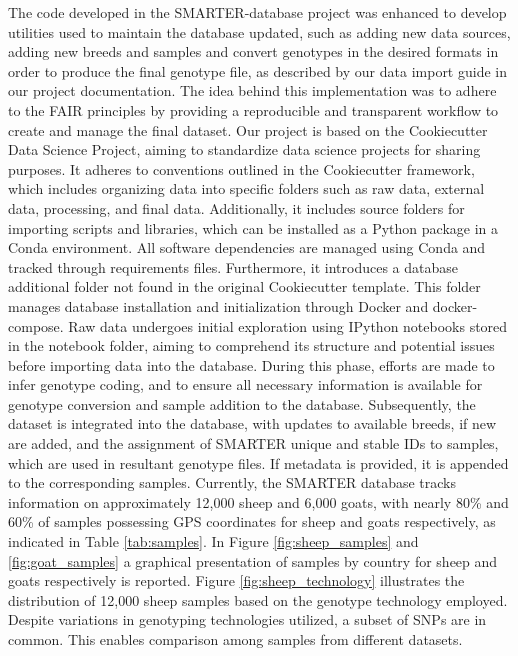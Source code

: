\documentclass[a4paper,num-refs,gigabyte]{oup-contemporary}
\begin{document}
The code developed in the SMARTER-database project was enhanced to develop utilities used to maintain the database updated, such as adding new data sources, adding new breeds and samples and convert genotypes in the desired formats in order to produce the final genotype file, as described by our data import guide\citep{DataImportProcess} in our project documentation. The idea behind this implementation
was to adhere to the FAIR principles\citep{Wilkinson2016} by providing a reproducible and transparent workflow to create and manage
the final dataset.
Our project is based on the Cookiecutter Data Science Project\citep{CookiecutterDataScience}, aiming to standardize data science projects for sharing purposes. It adheres to conventions outlined in the Cookiecutter framework\citep{Cookiecutter}, which includes organizing data into specific folders such as raw data, external data, processing, and final data. Additionally, it includes source folders for importing scripts and libraries, which can be installed as a Python package in a Conda\citep{Anaconda} environment. All software dependencies are managed using Conda and tracked through requirements files. Furthermore, it introduces a database additional folder not found in the original Cookiecutter template. This folder manages database installation and initialization through Docker\citep{Docker} and docker-compose\citep{DockerCompose}.
Raw data undergoes initial exploration using IPython notebooks stored in the notebook folder, aiming to comprehend its structure and potential issues before importing data into the database. During this phase, efforts are made to infer genotype coding, and to ensure all necessary information is available for genotype conversion and sample addition to the database. Subsequently, the dataset is integrated into the database, with updates to available breeds, if new are added, and the assignment of SMARTER unique and stable IDs to samples, which are used in resultant genotype files. If metadata is provided, it is appended to the corresponding samples. Currently, the SMARTER database tracks information on approximately 12,000 sheep and 6,000 goats, with nearly 80\% and 60\% of samples possessing GPS coordinates for sheep and goats respectively, as indicated in Table \ref{tab:samples}. In Figure \ref{fig:sheep_samples} and \ref{fig:goat_samples} a graphical presentation of samples by country for sheep and goats respectively is reported.
Figure \ref{fig:sheep_technology} illustrates the distribution of 12,000 sheep samples based on the genotype technology employed. Despite variations in genotyping technologies utilized, a subset of SNPs are in common. This enables comparison among samples from different datasets.
\end{document}
